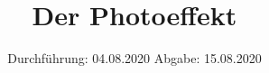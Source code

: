 

\subject{500}
\title{Der Photoeffekt}
\date{%
  Durchführung: 04.08.2020
  \hspace{3em}
  Abgabe: 15.08.2020
}



\maketitle
\thispagestyle{empty}
\tableofcontents
\newpage







\printbibliography{}



